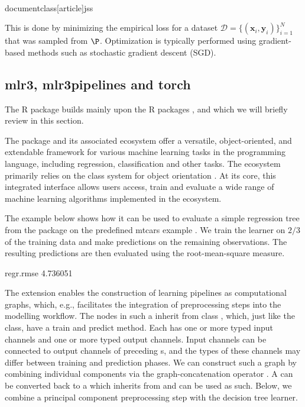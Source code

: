 \\documentclass[article]{jss}
\theoremstyle{definition}
\begin{document}
This is done by minimizing the empirical loss for a dataset $\mathcal{D} = \{ (\mathbf{x}_i, \mathbf{y}_i) \}_{i=1}^N$ that was sampled from $\P$.
Optimization is typically performed using gradient-based methods such as stochastic gradient descent (SGD).

\subsection{mlr3, mlr3pipelines and torch}

The  R package builds mainly upon the R packages  \citep{ref-mlr32019},  \citep{ref-mlr3pipelines2021} and  \citep{ref-torch2025} which we will briefly review in this section.

The  package and its associated ecosystem offer a versatile, object-oriented, and extendable framework for various machine learning tasks in the  programming language, including regression, classification and other tasks.
The ecosystem primarily relies on the  class system for object orientation \citep{ref-r6chang}.
At its core, this integrated interface allows users access, train and evaluate a wide range of machine learning algorithms implemented in the  ecosystem.

The example below shows how it can be used to evaluate a simple regression tree  from the  package \citep{ref-rpart2025} on the predefined mtcars example .
We train the learner on $2/3$ of the training data and make predictions on the remaining observations.
The resulting predictions are then evaluated using the root-mean-square measure.

\begin{CodeOutput}
regr.rmse
 4.736051
\end{CodeOutput}


The  extension enables the construction of learning pipelines as computational graphs, which, e.g., facilitates the integration of preprocessing steps into the modelling workflow.
The nodes in such a  inherit from class , which, just like the  class, have a train and predict method.
Each  has one or more typed input channels and one or more typed output channels. Input channels can be connected to output channels of preceding s, and the types of these channels may differ between training and prediction phases.
We can construct such a graph by combining individual components via the graph-concatenation operator \code{\%>>\%}.
A  can be converted back to a  which inherits from  and can be used as such.
Below, we combine a principal component preprocessing step with the decision tree learner.
\end{document}
